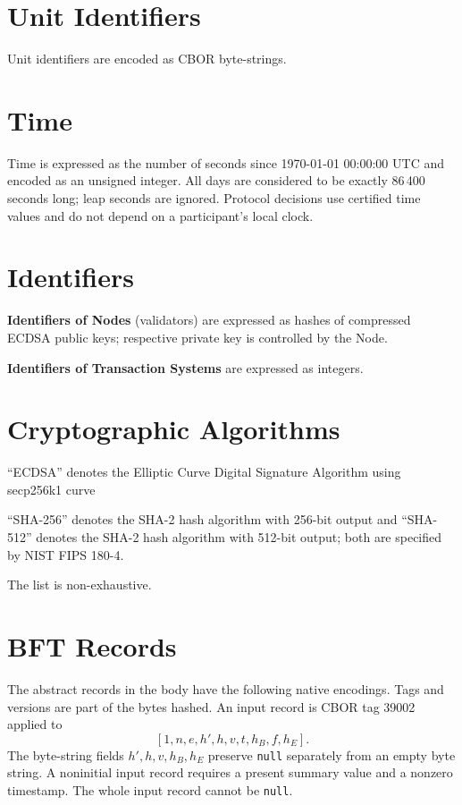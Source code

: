 \section{Unit Identifiers}

Unit identifiers are encoded as CBOR byte-strings.

\section{Time}

Time is expressed as the number of seconds since 1970-01-01 00:00:00 UTC and encoded as an unsigned integer. All days are considered to be exactly 86\,400 seconds long; leap seconds are ignored. Protocol decisions use certified time values and do not depend on a participant's local clock.

\section{Identifiers}

\textbf{Identifiers of Nodes} (validators) are expressed as hashes of compressed ECDSA public keys;
respective private key is controlled by the Node.

\textbf{Identifiers of Transaction Systems} are expressed as integers.

\section{Cryptographic Algorithms}

``ECDSA'' denotes the Elliptic Curve Digital Signature Algorithm using secp256k1 curve

``SHA-256'' denotes the SHA-2 hash algorithm with 256-bit output and ``SHA-512'' denotes the SHA-2 hash algorithm with 512-bit output; both are specified by NIST FIPS 180-4.

The list is non-exhaustive.


\section{BFT Records}\label{sec:bft-encoding}

The abstract records in the body have the following native encodings. Tags and versions are part of the bytes hashed. An input record is CBOR tag 39002 applied to
\[
[1,n,e,h',h,v,t,h_B,f,h_E].
\]
The byte-string fields $h',h,v,h_B,h_E$ preserve \texttt{null} separately from an empty byte string. A noninitial input record requires a present summary value and a nonzero timestamp. The whole input record cannot be \texttt{null}.

